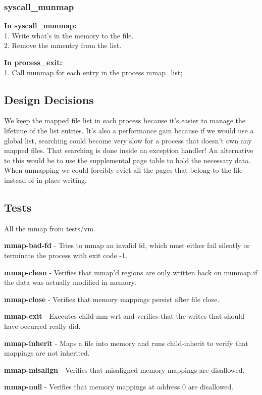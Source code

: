 \subsubsection{ syscall\_munmap }
\textbf{In syscall\_munmap:}
	\\1. Write what's in the memory to the file. 
	\\2. Remove the mmentry from the list.

	 \textbf{In process\_exit:}
	\\1. Call munmap for each entry in the process mmap\_list;


\subsection{Design Decisions}
We keep the mapped file list in each process because it's easier to manage the lifetime of the list entries. It's also a performance gain because if we would use a global list, searching could become very slow for a process that doesn't own any mapped files. That searching is done inside an exception handler! An alternative to this would be to use the supplemental page table to hold the necessary data.
\\When unmapping we could forcibly evict all the pages that belong to the file instead of in place writing.
\subsection{Tests}
All the mmap from tests/vm.


\textbf{mmap-bad-fd} - Tries to mmap an invalid fd, which must either fail silently or terminate the process with exit code -1.


\textbf{mmap-clean} - Verifies that mmap'd regions are only written back on munmap if the data was actually modified in memory.


\textbf{mmap-close} - Verifies that memory mappings persist after file close.


\textbf{mmap-exit} - Executes child-mm-wrt and verifies that the writes that should  have occurred really did.


\textbf{mmap-inherit} - Maps a file into memory and runs child-inherit to verify that  mappings are not inherited.


\textbf{mmap-misalign} - Verifies that misaligned memory mappings are disallowed.


\textbf{mmap-null} - Verifies that memory mappings at address 0 are disallowed.


